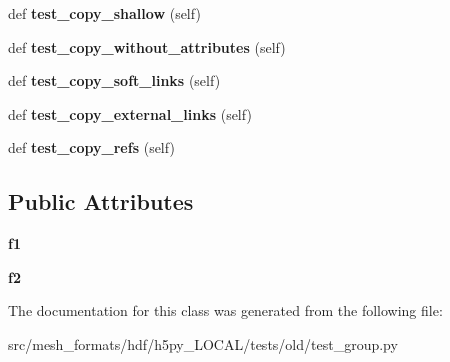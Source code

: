 \begin{DoxyCompactItemize}
def {\bfseries test\+\_\+copy\+\_\+shallow} (self)
\item 
\mbox{\label{classh5py__LOCAL_1_1tests_1_1old_1_1test__group_1_1TestCopy_af3a527d7d543faf2a9c3a999a1f3c648}} 
def {\bfseries test\+\_\+copy\+\_\+without\+\_\+attributes} (self)
\item 
\mbox{\label{classh5py__LOCAL_1_1tests_1_1old_1_1test__group_1_1TestCopy_a3c2470f313d875241250b0d63ba46d00}} 
def {\bfseries test\+\_\+copy\+\_\+soft\+\_\+links} (self)
\item 
\mbox{\label{classh5py__LOCAL_1_1tests_1_1old_1_1test__group_1_1TestCopy_a1f3f15c1ec230faa9d7f095dafeeffe1}} 
def {\bfseries test\+\_\+copy\+\_\+external\+\_\+links} (self)
\item 
\mbox{\label{classh5py__LOCAL_1_1tests_1_1old_1_1test__group_1_1TestCopy_aaa193a95d181ad5b3a2f12e44559dc02}} 
def {\bfseries test\+\_\+copy\+\_\+refs} (self)
\end{DoxyCompactItemize}
\subsection*{Public Attributes}
\begin{DoxyCompactItemize}
\item 
\mbox{\label{classh5py__LOCAL_1_1tests_1_1old_1_1test__group_1_1TestCopy_a9fba197de12cc44b4cef8dfcb345e38f}} 
{\bfseries f1}
\item 
\mbox{\label{classh5py__LOCAL_1_1tests_1_1old_1_1test__group_1_1TestCopy_ae872eb4a11185c61e3deb9fad268d92b}} 
{\bfseries f2}
\end{DoxyCompactItemize}


The documentation for this class was generated from the following file\+:\begin{DoxyCompactItemize}
\item 
src/mesh\+\_\+formats/hdf/h5py\+\_\+\+L\+O\+C\+A\+L/tests/old/test\+\_\+group.\+py\end{DoxyCompactItemize}
